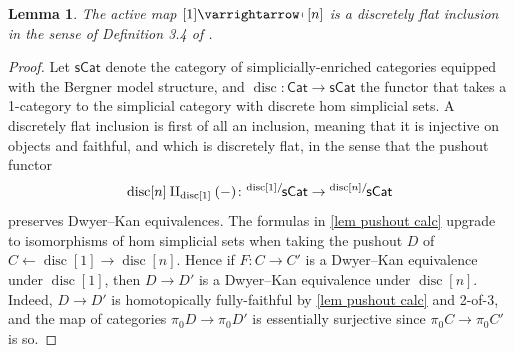 \documentclass{amsart}
\newcommand{\cat}{\mathsf{Cat}}
\newcommand{\scat}{\mathsf{sCat}}
\newcommand{\disc}{\operatorname{disc}}
\newcommand{\slicel}[2]{\vphantom{#2}^{{#1}/}\mkern-2mu{#2}}
\newcommand{\ract}{\varrightarrow\mapsfromchar}
\newtheorem{lemma}[theorem]{Lemma}
\theoremstyle{definition}
\theoremstyle{noname}
\begin{document}
\begin{lemma}\label{lem discretely flat}
The active map $[1] \ract [n]$ is a \emph{discretely flat inclusion} in the sense of Definition 3.4 of \cite{HORR-Dwyer}.
\end{lemma}
\begin{proof}
Let $\scat$ denote the category of simplicially-enriched categories equipped with the 
Bergner model structure, and $\disc \colon \cat \to \scat$ the functor that takes a 1-category to the simplicial category with discrete hom simplicial sets.
A discretely flat inclusion is first of all an inclusion, meaning that it is injective on objects and faithful, and which is discretely flat, in the sense that the pushout functor
\[\disc [n]  \amalg_{\disc [1] } (-) \colon \slicel{\disc [1]}{\scat} \to \slicel{\disc [n]}{\scat} \] 
preserves Dwyer--Kan equivalences.
The formulas in \cref{lem pushout calc} upgrade to isomorphisms of hom simplicial sets when taking the pushout $D$ of $C \leftarrow \disc [1] \rightarrow \disc [n]$.
Hence if $F \colon C \to C'$ is a Dwyer--Kan equivalence under $\disc [1]$, then $D \to D'$ is a Dwyer--Kan equivalence under $\disc [n]$.
Indeed, $D\to D'$ is homotopically fully-faithful by \cref{lem pushout calc} and 2-of-3, and the map of categories $\pi_0 D \to \pi_0 D'$ is essentially surjective since $\pi_0 C \to \pi_0 C'$ is so.
\end{proof}



\end{document}
